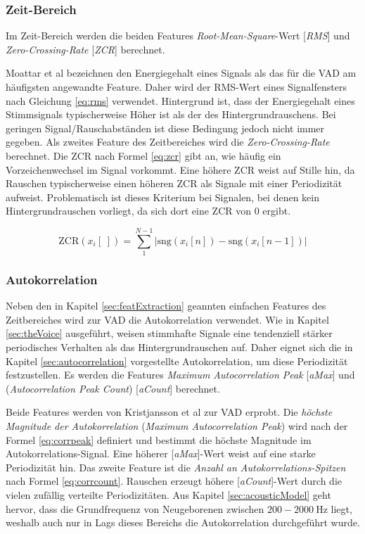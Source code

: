 \subsubsection{Zeit-Bereich}
\label{sec:timeFeats}

Im Zeit-Bereich werden die beiden Features \emph{Root-Mean-Square}-Wert [\emph{RMS}] und \emph{Zero-Crossing-Rate} [\emph{ZCR}] berechnet. 

Moattar et al \cite{vad_Easy} bezeichnen den Energiegehalt eines Signals als das für die VAD am häufigsten angewandte Feature. Daher wird der RMS-Wert eines Signalfensters nach Gleichung \ref{eq:rms} verwendet. Hintergrund ist, dass der Energiegehalt eines Stimmsignals typischerweise Höher ist als der des Hintergrundrauschens. Bei geringen Signal/Rauschabständen ist diese Bedingung jedoch nicht immer gegeben. Als zweites Feature des Zeitbereiches wird die \emph{Zero-Crossing-Rate} berechnet. Die ZCR nach Formel \ref{eq:zcr} gibt an, wie häufig ein Vorzeichenwechsel im Signal vorkommt. Eine höhere ZCR weist auf Stille hin, da Rauschen typischerweise einen höheren ZCR als Signale mit einer Periodizität aufweist. Problematisch ist dieses Kriterium bei Signalen, bei denen kein Hintergrundrauschen vorliegt, da sich dort eine ZCR von 0 ergibt.\cite{vad_ceps} 

\begin{equation}
\text{ZCR}(x_i[\;]) = \sum_{1}^{N-1}|\text{sng}(x_i[n])-\text{sng}(x_i[n-1])|
\label{eq:zcr}
\end{equation}

\subsubsection{Autokorrelation}

Neben den in Kapitel \ref{sec:featExtraction} geannten \glqq einfachen\grqq{} Features des Zeitbereiches wird zur VAD die Autokorrelation verwendet. Wie in Kapitel \ref{sec:theVoice} ausgeführt, weisen stimmhafte Signale eine tendenziell stärker periodisches Verhalten als das Hintergrundrauschen auf. Daher eignet sich die in Kapitel \ref{sec:autocorrelation} vorgestellte Autokorrelation, um diese Periodizität festzustellen. Es werden die Features \emph{Maximum Autocorrelation Peak} [\emph{aMax}] und (\emph{Autocorrelation Peak Count}) [\emph{aCount}] berechnet. 

Beide Features werden von Kristjansson et al \cite[S. 1 - 2]{vad_Lisboa} zur VAD erprobt. Die \emph{höchste Magnitude der Autokorrelation }  (\emph{Maximum Autocorrelation Peak}) wird nach der Formel \ref{eq:corrpeak} definiert und bestimmt die höchste Magnitude im Autokorrelations-Signal. Eine höherer [\emph{aMax}]-Wert weist auf eine starke Periodizität hin. Das zweite Feature ist die \emph{Anzahl an Autokorrelations-Spitzen} nach Formel \ref{eq:corrcount}. Rauschen erzeugt höhere [\emph{aCount}]-Wert durch die vielen zufällig verteilte Periodizitäten. Aus Kapitel \ref{sec:acousticModel} geht hervor, dass die Grundfrequenz von Neugeborenen zwischen $200 - \SI{2000}{\hertz}$ liegt, weshalb auch nur in Lags dieses Bereichs die Autokorrelation durchgeführt wurde.

